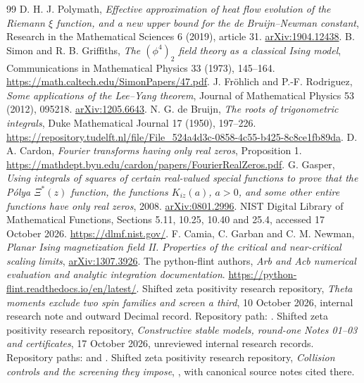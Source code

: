 \documentclass[11pt]{article}
\theoremstyle{remark}
\numberwithin{equation}{section}
\begin{document}
\begin{thebibliography}{99}
D. H. J. Polymath,
\emph{Effective approximation of heat flow evolution of the Riemann
\(\xi\) function, and a new upper bound for the de Bruijn--Newman constant},
Research in the Mathematical Sciences 6 (2019), article 31.
\href{https://arxiv.org/abs/1904.12438}{arXiv:1904.12438}.
B. Simon and R. B. Griffiths,
\emph{The \((\phi^4)_2\) field theory as a classical Ising model},
Communications in Mathematical Physics 33 (1973), 145--164.
\url{https://math.caltech.edu/SimonPapers/47.pdf}.
J. Fr\"ohlich and P.-F. Rodriguez,
\emph{Some applications of the Lee--Yang theorem},
Journal of Mathematical Physics 53 (2012), 095218.
\href{https://arxiv.org/abs/1205.6643}{arXiv:1205.6643}.
N. G. de Bruijn,
\emph{The roots of trigonometric integrals},
Duke Mathematical Journal 17 (1950), 197--226.
\url{https://repository.tudelft.nl/file/File_524a4d3c-0858-4c55-b425-8c8ce1fb89da}.
D. A. Cardon,
\emph{Fourier transforms having only real zeros}, Proposition 1.
\url{https://mathdept.byu.edu/cardon/papers/FourierRealZeros.pdf}.
G. Gasper,
\emph{Using integrals of squares of certain real-valued special functions
to prove that the P\'olya \(\Xi^*(z)\) function, the functions \(K_{iz}(a)\),
\(a>0\), and some other entire functions have only real zeros}, 2008.
\href{https://arxiv.org/abs/0801.2996}{arXiv:0801.2996}.
NIST Digital Library of Mathematical Functions,
Sections 5.11, 10.25, 10.40 and 25.4, accessed 17 October 2026.
\url{https://dlmf.nist.gov/}.
F. Camia, C. Garban and C. M. Newman,
\emph{Planar Ising magnetization field II. Properties of the critical and
near-critical scaling limits},
\href{https://arxiv.org/abs/1307.3926}{arXiv:1307.3926}.
The python-flint authors,
\emph{Arb and Acb numerical evaluation and analytic integration documentation}.
\url{https://python-flint.readthedocs.io/en/latest/}.
Shifted zeta positivity research repository,
\emph{Theta moments exclude two spin families and screen a third},
10 October 2026, internal research note and outward Decimal record.
Repository path:
.
Shifted zeta positivity research repository,
\emph{Constructive stable models, round-one Notes 01--03 and certificates},
17 October 2026, unreviewed internal research records.
Repository paths:
and
.
Shifted zeta positivity research repository,
\emph{Collision controls and the screening they impose},
,
with canonical source notes cited there.
\end{thebibliography}
\end{document}

